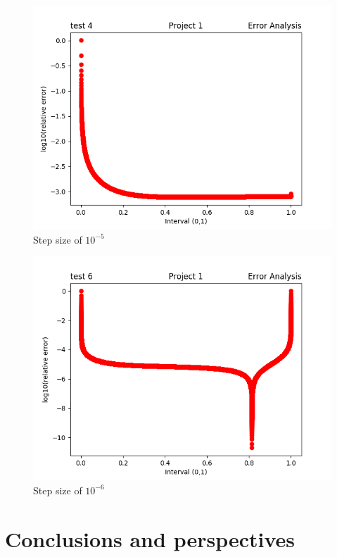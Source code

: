 \documentclass[11pt, oneside]{article}   	%
\begin{document}
\begin{figure}[H]
  \includegraphics[width=\linewidth]{test_5.png}
  \caption{Step size of $10^{-5}$}
  \label{fig:Relative Error}
\end{figure}

\begin{figure}[H]
  \includegraphics[width=\linewidth]{test_6.png}
  \caption{Step size of $10^{-6}$}
  \label{fig:Relative Error}
\end{figure}

\section{Conclusions and perspectives}
\end{document}
